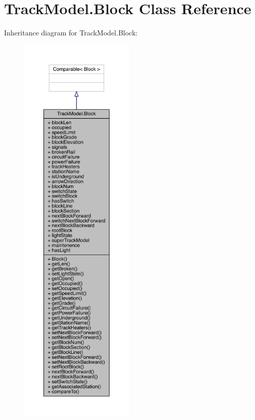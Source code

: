 \hypertarget{classTrackModel_1_1Block}{}\section{Track\+Model.\+Block Class Reference}
\label{classTrackModel_1_1Block}


Inheritance diagram for Track\+Model.\+Block\+:
\nopagebreak
\begin{figure}[H]
\begin{center}
\leavevmode
\includegraphics[height=550pt]{classTrackModel_1_1Block__inherit__graph}
\end{center}
\end{figure}


